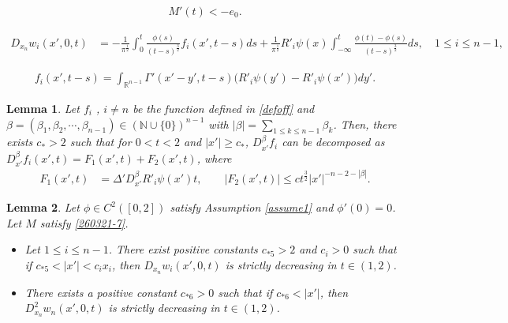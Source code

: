 \documentclass[10pt,a4paper]{amsart}
\newtheorem{lemma}{Lemma}
\newcommand{\De}{\Delta}
\newcommand{\Ga}{\Gamma}
\newcommand{\Rn}{{\mathbb R}^{n-1}}
\newcommand {\be}{\beta}
\begin{document}
\begin{align}\label{260321-7}
M'(t) < -e_0.
\end{align}

 \begin{align} \label{shortg}
D_{x_n} w_i (x', 0,t) & =  - \frac1{\pi^\frac12}  \int_0^t  \frac{ \phi(s)}{(t-s)^\frac32}     f_i (x', t-s) ds    + \frac1{\pi^\frac12}  R'_i \psi(x) \int_{-\infty}^t     \frac{\phi(t) - \phi(s)}{(t-s)^\frac32}  ds, \quad  1 \leq i \leq n-1, 
\end{align}

\begin{align}\label{defoff}
  f_i (x', t-s)  = \int_{\Rn}   \Ga'(x' -y', t-s) \big( R'_i \psi(y')   - R'_i \psi(x')    \big)  dy'.
\end{align}

\begin{lemma}\label{lemma1116-1}
Let $ f_i$ , $i\neq n$  be the function defined in \eqref{defoff} and $ \be = (\be_1,\be_2, \cdots, \be_{n-1})   \in ( {\mathbb N} \cup \{ 0\} )^{n-1}$ with $ |\be| = \sum_{1 \leq k \leq n-1} \be_k$.
Then, there exists  $ c_* > 2$ such that for $ 0 < t <2$ and $ |x'| \geq c_*$, 
$D_{x'}^\be  f_i$ can be  decomposed as $ D_{x'}^\be  f_i(x',t) = F_1(x', t) + F_2(x', t)$, where 
\begin{align*}
F_1(x',t) &  =   \De'  D_{x'}^\be   R'_i \psi (x'  )    t, \qquad |F_2 (x',t)|   \leq c t^\frac32 |x'|^{-n -2 -|\be|}.
\end{align*}

\end{lemma}

\begin{lemma}\label{theorem1221-2}
Let $\phi \in C^2([0,2])$ satisfy Assumption \ref{assume1} and $ \phi'(0) =0$. Let $M$ satisfy \eqref{260321-7}.  
\begin{itemize}
\item[(i)]
Let $ 1 \leq i \leq n-1$. There exist positive constants $ c_{*5}>2$ and $c_i>0$  such that  if $c_{*5} < |x'| < c_i x_i $,  then $ D_{x_n} w_i(x', 0,t)$ is strictly decreasing  in $ t \in (1,2)$.

\item[(ii)] There exists  a  positive constant $c_{*6}>0$ such that   if $c_{*6} < |x'|   $,  then $ D^2_{x_n} w_n(x', 0,t)$ is strictly decreasing in $t \in (1,2)$.
\end{itemize}

\end{lemma}
\end{document}
